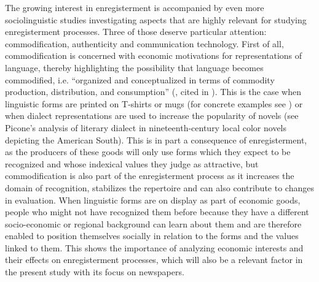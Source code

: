 The growing interest in enregisterment is accompanied by even more sociolinguistic studies investigating aspects that are highly relevant for studying enregisterment processes. Three of those deserve particular attention: commodification, authenticity and communication technology. First of all, commodification is concerned with economic motivations for representations of language, thereby highlighting the possibility that language becomes commodified, i.e. “organized and conceptualized in terms of commodity production, distribution, and consumption” (\citealt[207]{Fairclough1992}, cited in \citealt[161]{Johnstone2009}). This is the case when linguistic forms are printed on T-shirts or mugs (for concrete examples see \citealt{Beal2009,Cooper2013,Johnstone2009,Remlinger2009}) or when dialect representations are used to increase the popularity of novels (see Picone’s \citeyear{Picone2014} analysis of literary dialect in nineteenth-century local color novels depicting the American South). This is in part a consequence of enregisterment, as the producers of these goods will only use forms which they expect to be recognized and whose indexical values they judge as attractive, but commodification is also part of the enregisterment process as it increases the domain of recognition, stabilizes the repertoire and can also contribute to changes in evaluation. When linguistic forms are on display as part of economic goods, people who might not have recognized them before because they have a different socio-economic or regional background can learn about them and are therefore enabled to position themselves socially in relation to the forms and the values linked to them. This shows the importance of analyzing economic interests and their effects on enregisterment processes, which will also be a relevant factor in the present study with its focus on newspapers.

